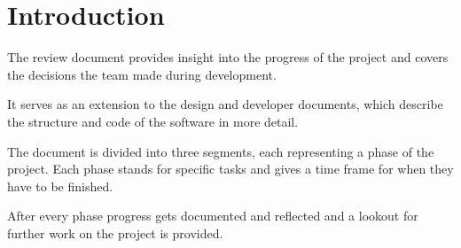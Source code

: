 \section{Introduction}
The review document provides insight into the progress of the project and covers the decisions the team made during development.

It serves as an extension to the design and developer documents, which describe the structure and code of the software in more detail.

The document is divided into three segments, each representing a phase of the project. 
Each phase stands for specific tasks and gives a time frame for when they have to be finished.

After every phase progress gets documented and reflected and a lookout for further work on the project is provided. 
 
   